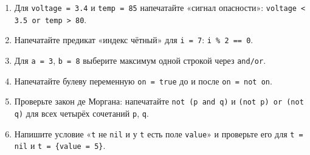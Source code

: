 \begin{taskbox}
\begin{enumerate}
  \item Для \verb|voltage = 3.4| и \verb|temp = 85| напечатайте «сигнал опасности»: \verb|voltage < 3.5 or temp > 80|.
  \item Напечатайте предикат «индекс чётный» для \verb|i = 7|: \verb|i % 2 == 0|.
  \item Для \verb|a = 3|, \verb|b = 8| выберите максимум одной строкой через \verb|and/or|.
  \item Напечатайте булеву переменную \verb|on = true| до и после \verb|on = not on|.
  \item Проверьте закон де Моргана: напечатайте \verb|not (p and q)| и \verb|(not p) or (not q)| для всех четырёх сочетаний \verb|p|, \verb|q|.
  \item Напишите условие «\verb|t| не \verb|nil| и у \verb|t| есть поле \verb|value|» и проверьте его для \verb|t = nil| и \verb|t = {value = 5}|.
\end{enumerate}
\end{taskbox}
